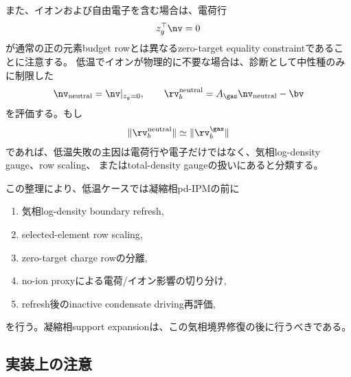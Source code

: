 また、イオンおよび自由電子を含む場合は、電荷行
\begin{align}
    z_g^\top \nv = 0
\end{align}
が通常の正の元素budget rowとは異なるzero-target equality constraintであることに注意する。
低温でイオンが物理的に不要な場合は、診断として中性種のみに制限した
\begin{align}
    \nv_{\rm neutral} = \nv|_{z_g=0},\qquad
    \rv_{b}^{\rm neutral}
    =
    A_\gas \nv_{\rm neutral} - \bv
\end{align}
を評価する。もし
\begin{align}
    \|\rv_{b}^{\rm neutral}\|
    \simeq
    \|\rv_{b}^{\gas}\|
\end{align}
であれば、低温失敗の主因は電荷行や電子だけではなく、気相log-density gauge、row scaling、
またはtotal-density gaugeの扱いにあると分類する。

この整理により、低温ケースでは凝縮相pd-IPMの前に
\begin{enumerate}
    \item 気相log-density boundary refresh,
    \item selected-element row scaling,
    \item zero-target charge rowの分離,
    \item no-ion proxyによる電荷/イオン影響の切り分け,
    \item refresh後のinactive condensate driving再評価,
\end{enumerate}
を行う。凝縮相support expansionは、この気相境界修復の後に行うべきである。

\subsection*{実装上の注意}

